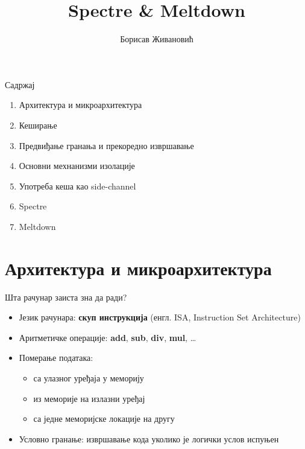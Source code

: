 \documentclass{beamer}
\title{Spectre \& Meltdown}
\author{Борисав Живановић}
\begin{document}
    \begin{frame}
        \maketitle
    \end{frame}

    \begin{frame}{Садржај}
        \begin{enumerate}
            \item Архитектура и микроархитектура
            \item Кеширање
            \item Предвиђање гранања и прекоредно извршавање
            \item Основни мехнанизми изолације
            \item Употреба кеша као side-channel
            \item Spectre
            \item Meltdown
        \end{enumerate}
    \end{frame}
    
    \section{Архитектура и микроархитектура}
    
    \begin{frame}{Шта рачунар заиста зна да ради?}
        \begin{itemize}
            \item Језик рачунара: \textbf{скуп инструкција} (енгл. ISA, Instruction Set Architecture)
            \item Аритметичке операције: \textbf{add}, \textbf{sub}, \textbf{div}, \textbf{mul}, …
            \item Померање података:
            \begin{itemize}
                \item са улазног уређаја у меморију
                \item из меморије на излазни уређај
                \item са једне меморијске локације на другу
            \end{itemize}
            \item Условно гранање: извршавање кода уколико је логички услов испуњен
        \end{itemize}
    \end{frame}
    
\end{document}
